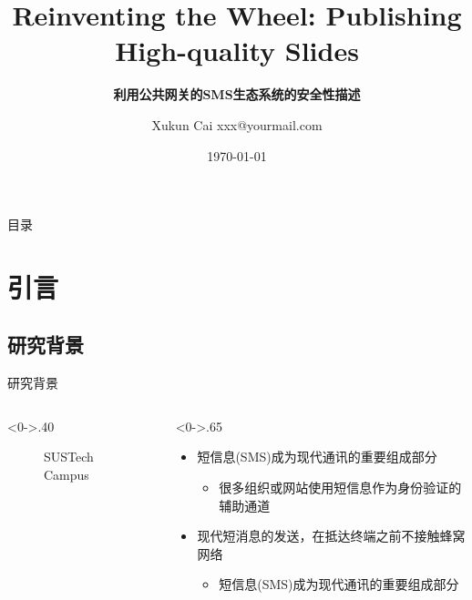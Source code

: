 \documentclass[10pt,aspectratio=43,mathserif]{beamer}
\title{Reinventing the Wheel: Publishing High-quality Slides}
\subtitle{\fontsize{9pt}{14pt}\textbf{利用公共网关的SMS生态系统的安全性描述}}
\author{Xukun Cai \newline \newline xxx@yourmail.com}
\institute{南方科技大学软件学院}
\date{\today}
\begin{document}

\frame{\titlepage}

\section[目录]{}   %
\begin{frame}{目录}
\tableofcontents
\end{frame}

\section{引言}  %
\subsection{研究背景}
\begin{frame}{研究背景}
\begin{columns}[T] %
\begin{column}<0->{.40\textwidth}
	\begin{figure}[thpb]
		\centering
		\caption{SUSTech Campus}
		\label{fig:campus}
	\end{figure}
\end{column}%
\hfill%
\begin{column}<0->{.65\textwidth}
	\begin{itemize}
		\item<1-> 短信息(SMS)成为现代通讯的重要组成部分
		\begin{itemize}
			\item<1-> 很多组织或网站使用短信息作为身份验证的辅助通道
		\end{itemize}
		\item<2-> 现代短消息的发送，在抵达终端之前不接触蜂窝网络
		\begin{itemize}
			\item<2-> 短信息(SMS)成为现代通讯的重要组成部分
		\end{itemize}
	\end{itemize}
\end{column}%
\end{columns}
\end{frame}
\end{document}
